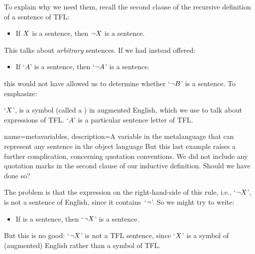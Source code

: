 To explain why we need them, recall the second clause of the recursive definition of a sentence of TFL:
\begin{itemize}
	\item[2.] If $X$ is a sentence, then $\neg X$ is a sentence.
\end{itemize}
This talks about \emph{arbitrary} sentences. If we had instead offered:
\begin{itemize}
	\item[2$'$.] If `$A$' is a sentence, then `$\neg A$' is a sentence.
\end{itemize}
this would not have allowed us to determine whether `$\neg B$' is a sentence. To emphasize:
\begin{highlighted}
	`$X$',  is a symbol (called a ) in augmented English, which we use to talk about expressions of TFL. 	`$A$' is a particular sentence letter of TFL.\end{highlighted}

{
	name=metavariables,
	description={A variable in the metalanguage that can represent any sentence in the object language}
}
But this last example raises a further complication, concerning quotation conventions. We did not include any quotation marks in the second clause of our inductive definition. Should we have done so?

The problem is that the expression on the right-hand-side of this rule, i.e., `$\neg X$', is not a sentence of English, since it contains~`$\neg$'. So we might try to write:
\begin{itemize}
	\item[2$''$.] If \metaX is a sentence, then `$\neg X$' is a sentence.
\end{itemize}
But this is no good: `$\neg X$' is not a TFL sentence, since `$X$' is a symbol of (augmented) English rather than a symbol of TFL.

